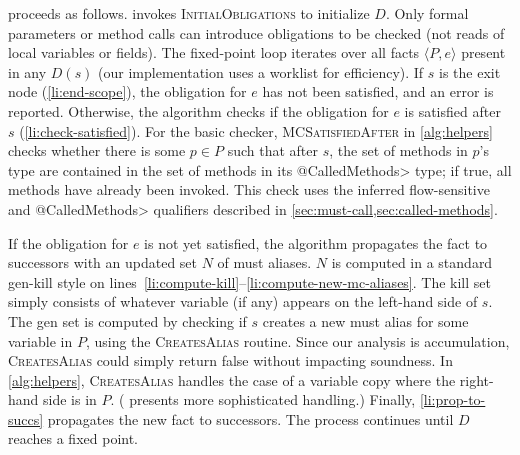  proceeds as follows.  
invokes \textsc{InitialObligations} to initialize $D$.  Only formal parameters
or method calls can introduce obligations to be checked (not reads of local
variables or fields).
The fixed-point loop
iterates over all facts $\langle P, e \rangle$ present in any
$D(s)$ (our implementation uses a worklist for efficiency).  If $s$ is the exit
node (\cref{li:end-scope}), the obligation for $e$ has not been satisfied, and
an error is reported.  Otherwise, the algorithm checks if the obligation for $e$
is satisfied after $s$ (\cref{li:check-satisfied}).  For the basic checker,
\textsc{MCSatisfiedAfter} in \cref{alg:helpers} checks whether there is some $p
\in P$ such that after $s$, the set of methods in $p$'s \MustCall type are contained
in the set of methods in its
\<@CalledMethods> type; if true, all \MustCall methods have already been
invoked.  This check uses the inferred flow-sensitive \MustCall and
\<@CalledMethods> qualifiers described in
\cref{sec:must-call,sec:called-methods}.

If the obligation for $e$ is not yet satisfied, the algorithm propagates the
fact to successors with an updated set $N$ of must aliases.  $N$ is computed in
a standard gen-kill style on
lines~\ref{li:compute-kill}--\ref{li:compute-new-mc-aliases}.  The kill set
simply consists of whatever variable (if any) appears on the left-hand side of
$s$.  The gen set is computed by checking if $s$ creates a new must alias for
some variable in $P$, using the \textsc{CreatesAlias} routine.  Since our
analysis is accumulation, \textsc{CreatesAlias} could simply return false
without impacting soundness.  In \cref{alg:helpers}, \textsc{CreatesAlias}
handles the case of a variable copy where the right-hand side is in $P$.
( presents more sophisticated handling.) Finally,
\cref{li:prop-to-succs} propagates the new fact to successors.  The process
continues until $D$ reaches a fixed point.

